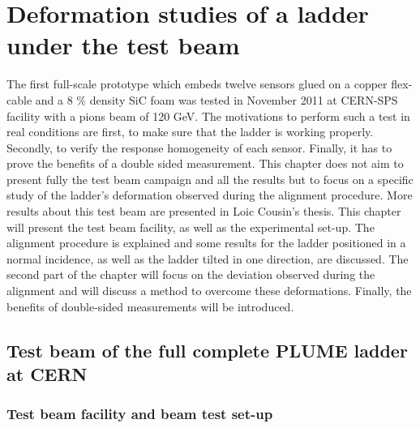 \chapter{Deformation studies of a ladder under the test beam}

  The first full-scale prototype which embeds twelve sensors glued on a copper flex-cable and a 8 \% density \gls{SiC} foam was tested in November 2011 at CERN-SPS facility with a pions beam of 120 GeV.
  The motivations to perform such a test in real conditions are first, to make sure that the ladder is working properly.
  Secondly, to verify the response homogeneity of each sensor.
  Finally, it has to prove the benefits of a double sided measurement.
  This chapter does not aim to present fully the test beam campaign and all the results but to focus on a specific study of the ladder's deformation observed during the alignment procedure.
  More results about this test beam are presented in Loic Cousin's thesis\cite{cousin}.
  This chapter will present the test beam facility, as well as the experimental set-up.
  The alignment procedure is explained and some results for the ladder positioned in a normal incidence, as well as the ladder tilted in one direction, are discussed.
  The second part of the chapter will focus on the deviation observed during the alignment and will discuss a method to overcome these deformations.
  Finally, the benefits of double-sided measurements will be introduced.
  
  \minitoc

  \section{Test beam of the full complete PLUME ladder at CERN}

    \subsection{Test beam facility and beam test set-up}

